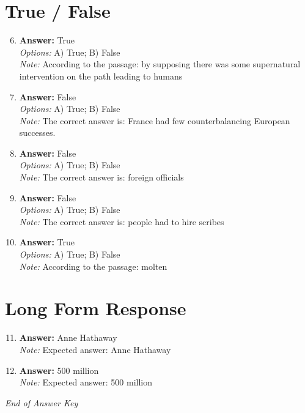 \documentclass[12pt]{article}
\begin{document}
\section*{True / False}
\begin{enumerate}[label=\arabic*.]
\setcounter{enumi}{5}
\item \textbf{Answer:} True
\\ \textit{Options:} A) True; B) False
\\ \textit{Note:} According to the passage: by supposing there was some supernatural intervention on the path leading to humans
\item \textbf{Answer:} False
\\ \textit{Options:} A) True; B) False
\\ \textit{Note:} The correct answer is: France had few counterbalancing European successes.
\item \textbf{Answer:} False
\\ \textit{Options:} A) True; B) False
\\ \textit{Note:} The correct answer is: foreign officials
\item \textbf{Answer:} False
\\ \textit{Options:} A) True; B) False
\\ \textit{Note:} The correct answer is: people had to hire scribes
\item \textbf{Answer:} True
\\ \textit{Options:} A) True; B) False
\\ \textit{Note:} According to the passage: molten
\end{enumerate}

\section*{Long Form Response}
\begin{enumerate}[label=\arabic*.]
\setcounter{enumi}{10}
\item \textbf{Answer:} Anne Hathaway
\\ \textit{Note:} Expected answer: Anne Hathaway
\item \textbf{Answer:} 500 million
\\ \textit{Note:} Expected answer: 500 million
\end{enumerate}

\vfill
\noindent\textit{End of Answer Key}
\end{document}
